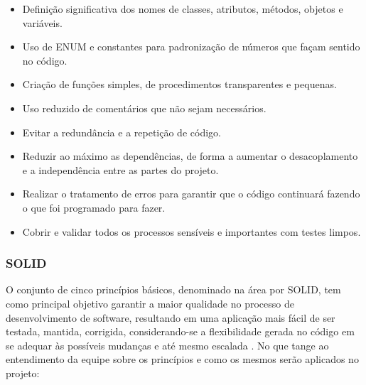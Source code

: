 \documentclass[
    12pt,               %
    openright,          %
    oneside,
    a4paper,            %
    BIBLATEX,           %
    TODO,               %
    english,            %
    brazil              %
    ]{ifsp-spo-inf-ctds}
\begin{document}
    \begin{itemize}
        \item 
        Definição significativa dos nomes de classes, atributos, métodos, objetos e variáveis.
        \item
        Uso de ENUM e constantes para padronização de números que façam sentido no código.
        \item
        Criação de funções simples, de procedimentos transparentes e pequenas.
        \item
        Uso reduzido de comentários que não sejam necessários.
        \item
        Evitar a redundância e a repetição de código.
        \item
        Reduzir ao máximo as dependências, de forma a aumentar o desacoplamento e a independência entre as partes do projeto.
        \item
        Realizar o tratamento de erros para garantir que o código continuará fazendo o que foi programado para fazer.
        \item
        Cobrir e validar todos os processos sensíveis e importantes com testes limpos.
    \end{itemize}

    \subsubsection{SOLID}
    O conjunto de cinco princípios básicos, denominado na área por SOLID, tem como principal objetivo garantir a maior qualidade no processo de desenvolvimento de software, resultando em uma aplicação mais fácil de ser testada, mantida, corrigida, considerando-se a flexibilidade gerada no código em se adequar às possíveis mudanças e até mesmo escalada . No que tange ao entendimento da equipe sobre os princípios e como os mesmos serão aplicados no projeto:
\end{document}
